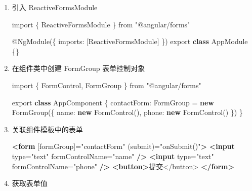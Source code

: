 \documentclass[
]{article}
\newenvironment{Shaded}{}{}
\newcommand{\DataTypeTok}[1]{\textcolor[rgb]{0.56,0.13,0.00}{#1}}
\newcommand{\FunctionTok}[1]{\textcolor[rgb]{0.02,0.16,0.49}{#1}}
\newcommand{\ImportTok}[1]{#1}
\newcommand{\KeywordTok}[1]{\textcolor[rgb]{0.00,0.44,0.13}{\textbf{#1}}}
\newcommand{\NormalTok}[1]{#1}
\newcommand{\OperatorTok}[1]{\textcolor[rgb]{0.40,0.40,0.40}{#1}}
\newcommand{\OtherTok}[1]{\textcolor[rgb]{0.00,0.44,0.13}{#1}}
\newcommand{\StringTok}[1]{\textcolor[rgb]{0.25,0.44,0.63}{#1}}
\begin{document}
\begin{enumerate}
\def\labelenumi{\arabic{enumi}.}
\item
  引入 ReactiveFormsModule

\begin{Shaded}
\begin{Highlighting}[]
\ImportTok{import}\NormalTok{ \{ ReactiveFormsModule \} }\ImportTok{from} \StringTok{"@angular/forms"}

\NormalTok{@}\FunctionTok{NgModule}\NormalTok{(\{}
  \DataTypeTok{imports}\OperatorTok{:}\NormalTok{ [ReactiveFormsModule]}
\NormalTok{\})}
\ImportTok{export} \KeywordTok{class}\NormalTok{ AppModule \{\}}
\end{Highlighting}
\end{Shaded}
\item
  在组件类中创建 FormGroup 表单控制对象

\begin{Shaded}
\begin{Highlighting}[]
\ImportTok{import}\NormalTok{ \{ FormControl}\OperatorTok{,}\NormalTok{ FormGroup \} }\ImportTok{from} \StringTok{"@angular/forms"}

\ImportTok{export} \KeywordTok{class}\NormalTok{ AppComponent \{}
  \DataTypeTok{contactForm}\OperatorTok{:}\NormalTok{ FormGroup }\OperatorTok{=} \KeywordTok{new} \FunctionTok{FormGroup}\NormalTok{(\{}
    \DataTypeTok{name}\OperatorTok{:} \KeywordTok{new} \FunctionTok{FormControl}\NormalTok{()}\OperatorTok{,}
    \DataTypeTok{phone}\OperatorTok{:} \KeywordTok{new} \FunctionTok{FormControl}\NormalTok{()}
\NormalTok{  \})}
\NormalTok{\}}
\end{Highlighting}
\end{Shaded}
\item
  关联组件模板中的表单

\begin{Shaded}
\begin{Highlighting}[]
\KeywordTok{\textless{}form}\OtherTok{ [formGroup]=}\StringTok{"contactForm"}\OtherTok{ (submit)=}\StringTok{"onSubmit()"}\KeywordTok{\textgreater{}}
  \KeywordTok{\textless{}input}\OtherTok{ type=}\StringTok{"text"}\OtherTok{ formControlName=}\StringTok{"name"} \KeywordTok{/\textgreater{}}
  \KeywordTok{\textless{}input}\OtherTok{ type=}\StringTok{"text"}\OtherTok{ formControlName=}\StringTok{"phone"} \KeywordTok{/\textgreater{}}
  \KeywordTok{\textless{}button\textgreater{}}\NormalTok{提交\textless{}/button\textgreater{}}
\KeywordTok{\textless{}/form\textgreater{}}
\end{Highlighting}
\end{Shaded}
\item
  获取表单值


\end{enumerate}
\end{document}
